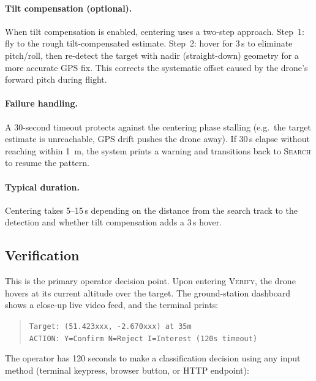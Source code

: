 \paragraph{Tilt compensation (optional).}  When tilt compensation is enabled, centering uses a two-step approach.  Step~1: fly to the rough tilt-compensated estimate.  Step~2: hover for 3\,s to eliminate pitch/roll, then re-detect the target with nadir (straight-down) geometry for a more accurate GPS fix.  This corrects the systematic offset caused by the drone's forward pitch during flight.

\paragraph{Failure handling.}  A 30-second timeout protects against the centering phase stalling (e.g.\ the target estimate is unreachable, GPS drift pushes the drone away).  If 30\,s elapse without reaching within \SI{1}{\metre}, the system prints a warning and transitions back to \textsc{Search} to resume the pattern.

\paragraph{Typical duration.}  Centering takes 5--15\,s depending on the distance from the search track to the detection and whether tilt compensation adds a 3\,s hover.

\subsection{Verification}\label{sec:mf-verify}

This is the primary operator decision point.  Upon entering \textsc{Verify}, the drone hovers at its current altitude over the target.  The ground-station dashboard shows a close-up live video feed, and the terminal prints:

\begin{quote}
\texttt{Target: (51.423xxx, -2.670xxx) at 35m \\
ACTION: Y=Confirm \quad N=Reject \quad I=Interest (120s timeout)}
\end{quote}

\noindent The operator has 120 seconds to make a classification decision using any input method (terminal keypress, browser button, or HTTP endpoint):

